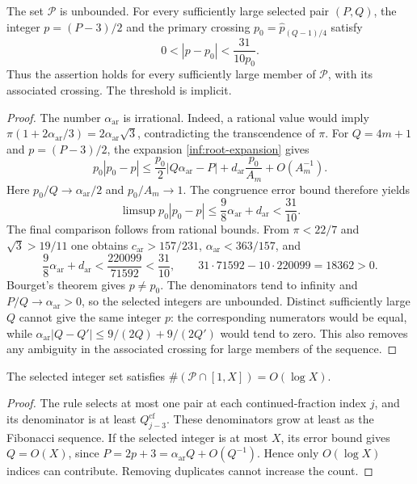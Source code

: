 \begin{theorem}\label{inf:near-integer}
The set $\mathcal P$ is unbounded. For every sufficiently large selected
pair $(P,Q)$, the integer $p=(P-3)/2$ and the primary crossing
$p_0=\widehat p_{(Q-1)/4}$ satisfy
\begin{equation}\label{inf:near-integer-bound}
 0<|p-p_0|<\frac{31}{10p_0}.
\end{equation}
Thus the assertion holds for every sufficiently large member of
$\mathcal P$, with its associated crossing. The threshold is implicit.
\end{theorem}
\begin{proof}
The number $\alpha_{\mathrm{ar}}$ is irrational. Indeed, a rational
value would imply
$\pi(1+2\alpha_{\mathrm{ar}}/3)=2\alpha_{\mathrm{ar}}\sqrt3$,
contradicting the transcendence of $\pi$.
For $Q=4m+1$ and $p=(P-3)/2$, the expansion
\eqref{inf:root-expansion} gives
\[
 p_0|p_0-p|\le\frac{p_0}{2}|Q\alpha_{\mathrm{ar}}-P|
              +d_{\mathrm{ar}}\frac{p_0}{A_m}+O(A_m^{-1}).
\]
Here $p_0/Q\to\alpha_{\mathrm{ar}}/2$ and $p_0/A_m\to1$.
The congruence error bound therefore yields
\begin{equation}\label{inf:arithmetic-limsup}
 \limsup p_0|p_0-p|
 \le\frac98\alpha_{\mathrm{ar}}+d_{\mathrm{ar}}<\frac{31}{10}.
\end{equation}
The final comparison follows from rational bounds. From
$\pi<22/7$ and $\sqrt3>19/11$ one obtains
$c_{\mathrm{ar}}>157/231$, $\alpha_{\mathrm{ar}}<363/157$, and
\[
 \frac98\alpha_{\mathrm{ar}}+d_{\mathrm{ar}}
 <\frac{220099}{71592}<\frac{31}{10},
 \qquad 31\cdot71592-10\cdot220099=18362>0.
\]
Bourget's theorem gives $p\ne p_0$. The denominators tend to infinity
and $P/Q\to\alpha_{\mathrm{ar}}>0$, so the selected integers are
unbounded. Distinct sufficiently large $Q$ cannot give the same
integer $p$: the corresponding numerators would be equal, while
$\alpha_{\mathrm{ar}}|Q-Q'|\le9/(2Q)+9/(2Q')$ would tend to zero.
This also removes any ambiguity in the associated crossing for large
members of the sequence.
\end{proof}

\begin{corollary}[Sparsity]\label{inf:sequence-sparsity}
The selected integer set satisfies $\#(\mathcal P\cap[1,X])=O(\log X)$.
\end{corollary}
\begin{proof}
The rule selects at most one pair at each continued-fraction index $j$,
and its denominator is at least $Q_{j-3}^{\mathrm{cf}}$. These denominators grow at
least as the Fibonacci sequence. If the selected integer is at most
$X$, its error bound gives $Q=O(X)$, since
$P=2p+3=\alpha_{\mathrm{ar}}Q+O(Q^{-1})$.
Hence only $O(\log X)$ indices can contribute. Removing duplicates
cannot increase the count.
\end{proof}

